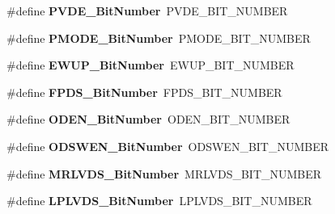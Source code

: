 \begin{DoxyCompactItemize}
\item 
\hypertarget{group___h_a_l___p_w_r___aliased_ga17d618eb800c401ef9c6789c9374eaf8}{\#define {\bfseries P\-V\-D\-E\-\_\-\-Bit\-Number}~P\-V\-D\-E\-\_\-\-B\-I\-T\-\_\-\-N\-U\-M\-B\-E\-R}\label{group___h_a_l___p_w_r___aliased_ga17d618eb800c401ef9c6789c9374eaf8}

\item 
\hypertarget{group___h_a_l___p_w_r___aliased_ga15fea9df1b0d324394336f70b319b377}{\#define {\bfseries P\-M\-O\-D\-E\-\_\-\-Bit\-Number}~P\-M\-O\-D\-E\-\_\-\-B\-I\-T\-\_\-\-N\-U\-M\-B\-E\-R}\label{group___h_a_l___p_w_r___aliased_ga15fea9df1b0d324394336f70b319b377}

\item 
\hypertarget{group___h_a_l___p_w_r___aliased_ga94fe0520e8f9b71fa2b99c0565ec70ea}{\#define {\bfseries E\-W\-U\-P\-\_\-\-Bit\-Number}~E\-W\-U\-P\-\_\-\-B\-I\-T\-\_\-\-N\-U\-M\-B\-E\-R}\label{group___h_a_l___p_w_r___aliased_ga94fe0520e8f9b71fa2b99c0565ec70ea}

\item 
\hypertarget{group___h_a_l___p_w_r___aliased_gad99a3da921e3e64587f6b9505ecba665}{\#define {\bfseries F\-P\-D\-S\-\_\-\-Bit\-Number}~F\-P\-D\-S\-\_\-\-B\-I\-T\-\_\-\-N\-U\-M\-B\-E\-R}\label{group___h_a_l___p_w_r___aliased_gad99a3da921e3e64587f6b9505ecba665}

\item 
\hypertarget{group___h_a_l___p_w_r___aliased_ga2f24ddbcbc5b8d74c0b032cfa53c725a}{\#define {\bfseries O\-D\-E\-N\-\_\-\-Bit\-Number}~O\-D\-E\-N\-\_\-\-B\-I\-T\-\_\-\-N\-U\-M\-B\-E\-R}\label{group___h_a_l___p_w_r___aliased_ga2f24ddbcbc5b8d74c0b032cfa53c725a}

\item 
\hypertarget{group___h_a_l___p_w_r___aliased_gaf2e21cacf95f557d2535d623c41577c2}{\#define {\bfseries O\-D\-S\-W\-E\-N\-\_\-\-Bit\-Number}~O\-D\-S\-W\-E\-N\-\_\-\-B\-I\-T\-\_\-\-N\-U\-M\-B\-E\-R}\label{group___h_a_l___p_w_r___aliased_gaf2e21cacf95f557d2535d623c41577c2}

\item 
\hypertarget{group___h_a_l___p_w_r___aliased_ga50e53827046644c175fe431eea5f4261}{\#define {\bfseries M\-R\-L\-V\-D\-S\-\_\-\-Bit\-Number}~M\-R\-L\-V\-D\-S\-\_\-\-B\-I\-T\-\_\-\-N\-U\-M\-B\-E\-R}\label{group___h_a_l___p_w_r___aliased_ga50e53827046644c175fe431eea5f4261}

\item 
\hypertarget{group___h_a_l___p_w_r___aliased_ga7ebe7d965ce7638645ee9a5e35c01be7}{\#define {\bfseries L\-P\-L\-V\-D\-S\-\_\-\-Bit\-Number}~L\-P\-L\-V\-D\-S\-\_\-\-B\-I\-T\-\_\-\-N\-U\-M\-B\-E\-R}\label{group___h_a_l___p_w_r___aliased_ga7ebe7d965ce7638645ee9a5e35c01be7}


\end{DoxyCompactItemize}
